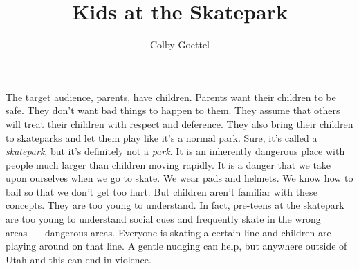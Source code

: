 \documentclass[12pt]{article}
\title{Kids at the Skatepark}
\author{Colby Goettel}
\begin{document}
\maketitle




The target audience, parents, have children. Parents want their children to be safe. They don't want bad things to happen to them. They assume that others will treat their children with respect and deference. They also bring their children to skateparks and let them play like it's a normal park. Sure, it's called a \textit{skatepark}, but it's definitely not a \textit{park}. It is an inherently dangerous place with people much larger than children moving rapidly. It is a danger that we take upon ourselves when we go to skate. We wear pads and helmets. We know how to bail so that we don't get too hurt. But children aren't familiar with these concepts. They are too young to understand. In fact, pre-teens at the skatepark are too young to understand social cues and frequently skate in the wrong areas~--- dangerous areas. Everyone is skating a certain line and children are playing around on that line. A gentle nudging can help, but anywhere outside of Utah and this can end in violence.
\end{document}
